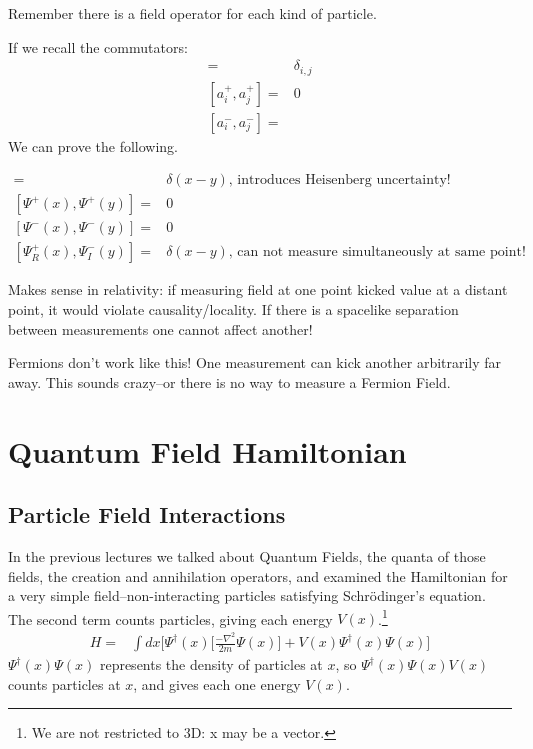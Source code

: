 \documentclass[]{article}
\begin{document}
Remember there is a field operator for each kind of particle.

If we recall the commutators:
\begin{align*}
	[a^+_i,a^-_j] =& \delta_{i,j}\\
	[a^+_i,a^+_j] =& 0\\
	[a^-_i,a^-_j] =& 
\end{align*}
We can prove the following.
 
\begin{align*}
	[\Psi^+(x),\Psi^-(y)] =& \delta(x-y) \text{, introduces Heisenberg uncertainty!}\\
	[\Psi^+(x),\Psi^+(y)] =&0 \\
	[\Psi^-(x),\Psi^-(y)] =&0\\
	[\Psi^+_R(x),\Psi^-_I(y)] =& \delta(x-y) \text{, can not measure simultaneously at same point!}
\end{align*}

Makes sense in relativity: if measuring field at one point kicked value at a distant point, it would violate causality/locality. If there is a spacelike separation between measurements one cannot affect another!

Fermions don't work like this! One measurement can kick another arbitrarily far away. This sounds crazy--or there is no way to measure a Fermion Field.

\section{Quantum Field Hamiltonian}



\subsection{Particle Field Interactions}

In the previous lectures we talked about Quantum Fields, the quanta of those fields, the creation and annihilation operators, and examined the Hamiltonian for a very simple field--non-interacting particles satisfying Schr\"odinger's equation. The second term counts particles, giving each energy $V(x)$.\footnote{We are not restricted to 3D: x may be a vector.}
\begin{align*}
	H =& \int dx \big[ \Psi^\dagger(x) \big[\frac{- \nabla^2}{2m} \Psi(x) \big]+ V(x) \Psi^\dagger(x) \Psi(x) \big] 
\end{align*}
$\Psi^\dagger(x) \Psi(x)$ represents the density of particles at $x$, so $\Psi^\dagger(x) \Psi(x) V(x)$ counts particles at $x$, and gives each one energy $V(x)$.
\end{document}
